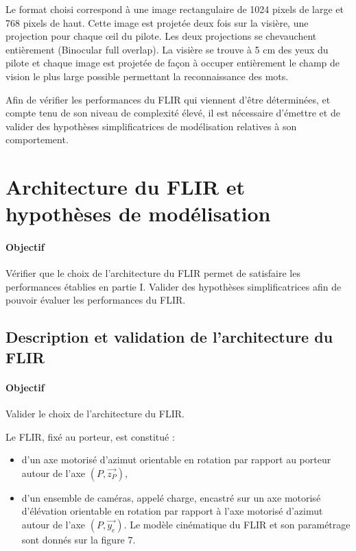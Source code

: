Le format choisi correspond à une image rectangulaire de 1024 pixels de large et 768 pixels de haut. Cette image est projetée deux fois sur la visière, une projection pour chaque œil du pilote. Les deux projections se chevauchent entièrement (Binocular full overlap). La visière se trouve à 5 cm des yeux du pilote et chaque image est projetée de façon à occuper entièrement le champ de vision le plus large possible permettant la reconnaissance des mots.



Afin de vérifier les performances du FLIR qui viennent d'être déterminées, et compte tenu de son niveau de complexité élevé, il est nécessaire d'émettre et de valider des hypothèses simplificatrices de modélisation relatives à son comportement.

\section{Architecture du FLIR et hypothèses de modélisation}

\paragraph{Objectif} Vérifier que le choix de l'architecture du FLIR permet de satisfaire les performances établies en partie I. Valider des hypothèses simplificatrices afin de pouvoir évaluer les performances du FLIR.

\subsection{Description et validation de l'architecture du FLIR}

\paragraph{Objectif} Valider le choix de l'architecture du FLIR.

Le FLIR, fixé au porteur, est constitué :
\begin{itemize}
 \item d'un axe motorisé d'azimut orientable en rotation par rapport au porteur autour de l'axe $(P,\overrightarrow{z_P})$,
 \item d'un ensemble de caméras, appelé charge, encastré sur un axe motorisé d'élévation orientable en rotation par rapport à l'axe motorisé d'azimut autour de l'axe $(P,\overrightarrow{y_e})$.
Le modèle cinématique du FLIR et son paramétrage sont donnés sur la figure 7.
\end{itemize}

